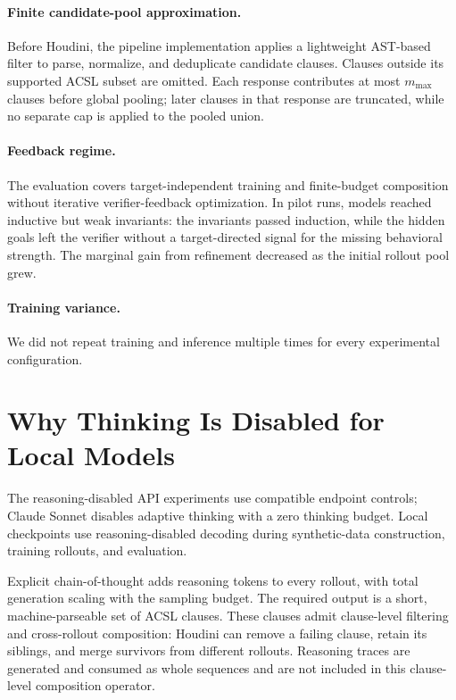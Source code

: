 \paragraph{Finite candidate-pool approximation.}
Before Houdini, the pipeline implementation applies a lightweight AST-based
filter to parse, normalize, and deduplicate candidate clauses.  Clauses outside
its supported ACSL subset are omitted.  Each response contributes at most
\(m_{\max}\) clauses before global pooling; later clauses in that response are
truncated, while no separate cap is applied to the pooled union.

\paragraph{Feedback regime.}
The evaluation covers target-independent training and finite-budget
composition without iterative verifier-feedback optimization.  In pilot runs,
models reached inductive but weak invariants: the invariants passed induction,
while the hidden goals left the verifier without a target-directed signal for
the missing behavioral strength.  The marginal gain from refinement decreased
as the initial rollout pool grew.

\paragraph{Training variance.}
We did not repeat training and inference multiple times for every experimental
configuration.

\section{Why Thinking Is Disabled for Local Models}
\label{app:no-thinking}

The reasoning-disabled API experiments use compatible endpoint controls;
Claude Sonnet disables adaptive thinking with a zero thinking budget.  Local
checkpoints use reasoning-disabled decoding during synthetic-data construction,
training rollouts, and evaluation.

Explicit chain-of-thought adds reasoning tokens to every rollout, with total
generation scaling with the sampling budget.  The required output is a short,
machine-parseable set of ACSL clauses.  These clauses admit clause-level
filtering and cross-rollout composition: Houdini can remove a failing clause,
retain its siblings, and merge survivors from different rollouts.  Reasoning
traces are generated and consumed as whole sequences and are not included in
this clause-level composition operator.

